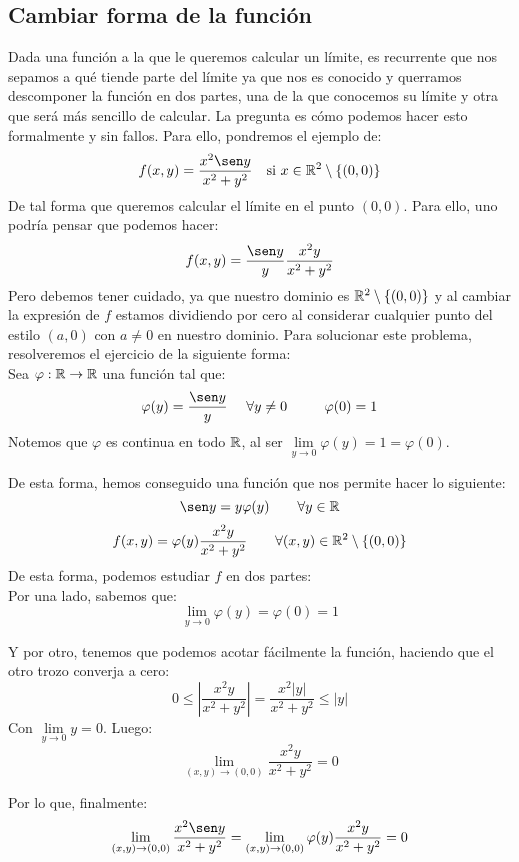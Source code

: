\subsection{Cambiar forma de la función}

Dada una función a la que le queremos calcular un límite, es recurrente que nos sepamos a qué tiende
parte del límite ya que nos es conocido y querramos descomponer la función en dos partes, una
de la que conocemos su límite y otra que será más sencillo de calcular. La pregunta es cómo podemos
hacer esto formalmente y sin fallos. Para ello, pondremos el ejemplo de:
$$f(x,y) = \dfrac{x^2 \sen y}{x^2+y^2}~~\mbox{ si } x \in \R^2 \setminus\{(0,0)\}$$
De tal forma que queremos calcular el límite en el punto $(0,0)$. Para ello, uno podría pensar
que podemos hacer:
$$f(x,y) = \dfrac{\sen y}{y} \dfrac{x^2y}{x^2+y^2}$$
Pero debemos tener cuidado, ya que nuestro dominio es $\mathbb R^2\setminus\{(0,0)\}$ y al cambiar la
expresión de $f$ estamos dividiendo por cero al considerar cualquier punto del estilo $(a,0)$ con
$a \neq 0$ en nuestro dominio.
Para solucionar este problema, resolveremos el ejercicio de la siguiente forma:\\


Sea $\varphi:\mathbb R \rightarrow \mathbb R$ una función tal que:
$$\varphi(y) = \dfrac{\sen y}{y}~~~~\forall y \neq 0~~~~~~~~\varphi(0)=1$$
Notemos que $\varphi$ es continua en todo $\mathbb R$, al ser $\lim\limits_{y \to 0}\varphi(y) = 1 = \varphi(0)$.


De esta forma, hemos conseguido una función que nos permite hacer lo siguiente:
$$\sen y = y\varphi(y)~~~~~~\forall y \in \R$$
$$f(x,y)=\varphi(y)\dfrac{x^2y}{x^2+y^2}~~~~~~\forall (x,y) \in \mathbb R^2\setminus\{(0,0)\}$$
De esta forma, podemos estudiar $f$ en dos partes:\\


Por una lado, sabemos que:
$$\lim_{y \to 0} \varphi(y) = \varphi(0) = 1$$


Y por otro, tenemos que podemos acotar fácilmente la función, haciendo que el otro trozo converja a cero:
$$0 \leq \left| \dfrac{x^2y}{x^2+y^2} \right| = \dfrac{x^2|y|}{x^2+y^2} \leq |y|$$
Con $\lim\limits_{y \to 0}y = 0$. Luego:
$$\lim_{(x,y) \to (0,0)} \dfrac{x^2y}{x^2+y^2}=0$$


Por lo que, finalmente:
$$\lim_{(x,y) \to (0,0)} \dfrac{x^2\sen y}{x^2+y^2} = \lim_{(x,y) \to (0,0)} \varphi(y)\dfrac{x^2y}{x^2+y^2}=0$$
